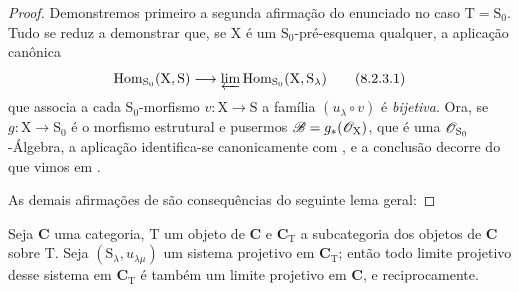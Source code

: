 \begin{proof}
Demonstremos primeiro a segunda afirmação do enunciado no caso $\mathrm{T}=\mathrm{S}_0$.
Tudo se reduz a demonstrar que, se $\mathrm{X}$ é um $\mathrm{S}_0$-pré-esquema qualquer, a aplicação canônica
\begin{equation}
  \operatorname{Hom}_{\mathrm{S}_0}(\mathrm{X},\mathrm{S})\to\varprojlim\operatorname{Hom}_{\mathrm{S}_0}(\mathrm{X},\mathrm{S}_\lambda)
  \tag{8.2.3.1}
\label{IV.8.2.3.1}
\end{equation}
que associa a cada $\mathrm{S}_0$-morfismo $v:\mathrm{X}\to\mathrm{S}$ a família $(u_\lambda\circ v)$ é \emph{bijetiva}.
Ora, se $g:\mathrm{X}\to\mathrm{S}_0$ é o morfismo estrutural e pusermos $\mathscr{B}=g_*(\mathscr{O}_\mathrm{X})$, que é uma $\mathscr{O}_{\mathrm{S}_0}$-Álgebra, a aplicação  identifica-se canonicamente com  , e a conclusão decorre do que vimos em .

As demais afirmações de  são consequências do seguinte lema geral:
\end{proof}

\begin{lemma}[8.2.4]
\label{IV.8.2.4}
Seja $\mathbf{C}$ uma categoria, $\mathrm{T}$ um objeto de $\mathbf{C}$ e $\mathbf{C}_\mathrm{T}$ a subcategoria dos objetos de $\mathbf{C}$ sobre $\mathrm{T}$.
Seja $(\mathrm{S}_\lambda,u_{\lambda\mu})$ um sistema projetivo em $\mathbf{C}_\mathrm{T}$; então todo limite projetivo desse sistema em $\mathbf{C}_\mathrm{T}$ é também um limite projetivo em $\mathbf{C}$, e reciprocamente.
\end{lemma}

